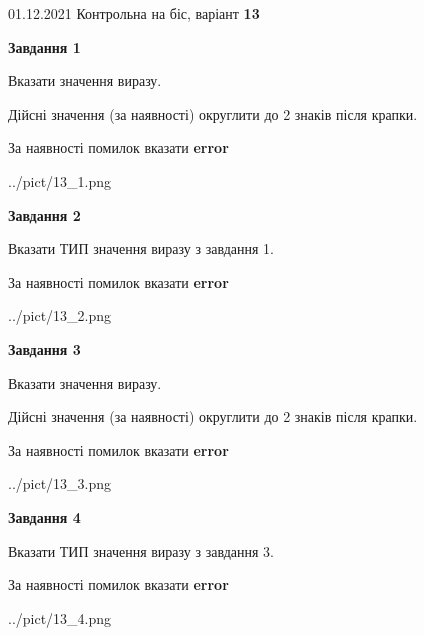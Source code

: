 \documentclass[11pt, ukrainian]{article}
\begin{document}
{01.12.2021 Контрольна на біс, варіант  \No \textbf { 13 }\par}
{
\begin {large}
{\begin {center}\textbf{Завдання 1}\end {center}}\par
Вказати значення виразу. \par
Дійсні значення (за наявності) округлити до 2 знаків після крапки. \par
За наявності помилок вказати \textbf{error}

\begin{center}
	{../pict/13_1.png}
\end{center}
\newpage

{\begin {center}\textbf{Завдання 2}\end {center}}\par
Вказати ТИП значення виразу з завдання 1. \par
За наявності помилок вказати \textbf{error}

\begin{center}
	{../pict/13_2.png}
\end{center}
\newpage

{\begin {center}\textbf{Завдання 3}\end {center}}\par
Вказати значення виразу. \par
Дійсні значення (за наявності) округлити до 2 знаків після крапки. \par
За наявності помилок вказати \textbf{error}

\begin{center}
	{../pict/13_3.png}
\end{center}
\newpage

{\begin {center}\textbf{Завдання 4}\end {center}}\par
Вказати ТИП значення виразу з завдання 3. \par
За наявності помилок вказати \textbf{error}

\begin{center}
	{../pict/13_4.png}
\end{center}
\newpage


\end{large}}
\end{document}
